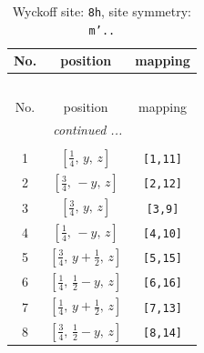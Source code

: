 \documentclass[fleqn,8pt]{jsarticle}
\begin{document}
\begin{longtable}{ccc}
\caption{Wyckoff site: {\tt 8h}, site symmetry: {\tt m'..}}
 \\
 \hline \hline
No. & position & mapping \\ \hline \endfirsthead

\multicolumn{2}{l}{\tablename\ \thetable{}} \\
 \hline \hline
No. & position & mapping \\ \hline \endhead

 \hline \hline
\multicolumn{2}{r}{\footnotesize\it continued ...} \\ \endfoot

 \hline \hline
\multicolumn{2}{r}{} \\ \endlastfoot

1 & $\left[ \frac{1}{4},\, y,\, z \right]$ & {\tt [1,11]} \\ \hline
2 & $\left[ \frac{3}{4},\, - y,\, z \right]$ & {\tt [2,12]} \\ \hline
3 & $\left[ \frac{3}{4},\, y,\, z \right]$ & {\tt [3,9]} \\ \hline
4 & $\left[ \frac{1}{4},\, - y,\, z \right]$ & {\tt [4,10]} \\ \hline
5 & $\left[ \frac{3}{4},\, y + \frac{1}{2},\, z \right]$ & {\tt [5,15]} \\ \hline
6 & $\left[ \frac{1}{4},\, \frac{1}{2} - y,\, z \right]$ & {\tt [6,16]} \\ \hline
7 & $\left[ \frac{1}{4},\, y + \frac{1}{2},\, z \right]$ & {\tt [7,13]} \\ \hline
8 & $\left[ \frac{3}{4},\, \frac{1}{2} - y,\, z \right]$ & {\tt [8,14]} \\
\end{longtable}
\renewcommand{\arraystretch}{1.2}
\end{document}
